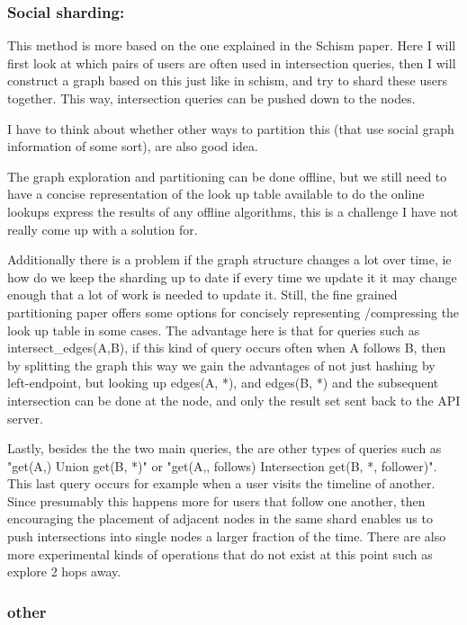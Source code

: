 \documentclass{article}
\begin{document}
\subsubsection{Social sharding:}
This method is more based on the one explained in the Schism paper. Here I will first look at which pairs of users are often used in intersection queries, then I will construct a graph based on this just like in schism, and try to shard these users together. This way, intersection queries can be pushed down to the nodes.

I have to think about whether other ways to partition this (that use social graph information of some sort), are also  good idea.

The graph exploration and partitioning can be done offline, but we still need to have a concise representation of the look up table available to do the online lookups express the results of any offline algorithms, this is a challenge I have not really come up with a solution for. 

Additionally there is a problem if the graph structure changes a lot over time, ie how do we keep the sharding up to date if every time we update it it may change enough that a lot of work is needed to update it.  Still, the fine grained partitioning paper offers some options for concisely representing /compressing the look up table in some cases. The advantage here is that for queries such as intersect\_edges(A,B), if this kind of query occurs often when A follows B, then by splitting the graph this way we gain the advantages of not just hashing by left-endpoint, but looking up edges(A, *), and edges(B, *) and the subsequent intersection can be done at the node, and only the result set sent back to the API server.

Lastly, besides the the two main queries, the are other types of queries such as "get(A,) Union get(B, *)" or "get(A,, follows) Intersection get(B, *, follower)". This last query occurs for example when a user visits the timeline of another.  Since presumably this happens more for users that follow one another, then encouraging the placement of adjacent nodes in the same shard enables us to push intersections into single nodes a larger fraction of the time. There are also more experimental kinds of operations that do not exist at this point such as explore 2 hops away.

\subsubsection{other}
\end{document}
